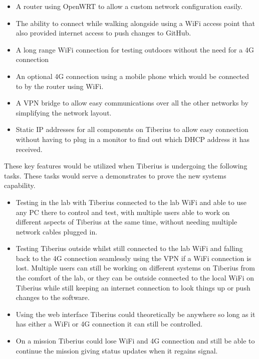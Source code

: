 \begin{itemize}
\item A router using OpenWRT to allow a custom network configuration easily.
\item The ability to connect while walking alongside using a WiFi access point that also provided internet access to push changes to GitHub.
\item A long range WiFi connection for testing outdoors without the need for a 4G connection
\item An optional 4G connection using a mobile phone which would be connected to by the router using WiFi.
\item A VPN bridge to allow easy communications over all the other networks by simplifying the network layout.
\item Static IP addresses for all components on Tiberius to allow easy connection without having to plug in a monitor to find out which DHCP address it has received.
\end{itemize}
These key features would be utilized when Tiberius is undergoing the following tasks. These tasks would serve a demonstrates to prove the new systems capability. 
\begin{itemize}
\item Testing in the lab with Tiberius connected to the lab WiFi and able to use any PC there to control and test, with multiple users able to work on different aspects of Tiberius at the same time, without needing multiple network cables plugged in.

\item Testing Tiberius outside whilst still connected to the lab WiFi and falling back to the 4G connection seamlessly using the VPN if a WiFi connection is lost. Multiple users can still be working on different systems on Tiberius from the comfort of the lab, or they can be outside connected to the local WiFi on Tiberius while still keeping an internet connection to look things up or push changes to the software.

\item Using the web interface Tiberius could theoretically be anywhere so long as it has either a WiFi or 4G connection it can still be controlled.

\item On a mission Tiberius could lose WiFi and 4G connection and still be able to continue the mission giving status updates when it regains signal.
\end{itemize}



